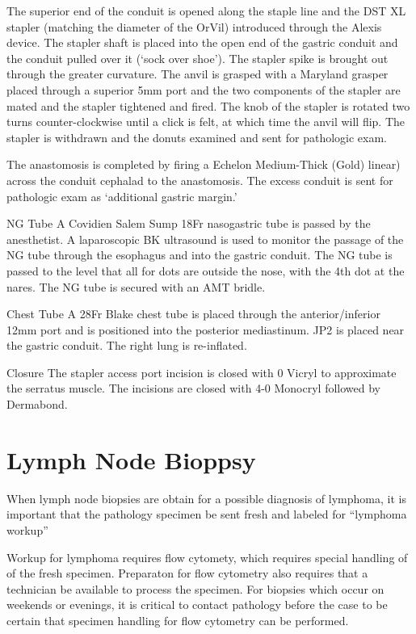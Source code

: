 \documentclass[
]{book}
\begin{document}
The superior end of the conduit is opened along the staple line and the DST XL stapler (matching the diameter of the OrVil) introduced through the Alexis device. The stapler shaft is placed into the open end of the gastric conduit and the conduit pulled over it (`sock over shoe'). The stapler spike is brought out through the greater curvature. The anvil is grasped with a Maryland grasper placed through a superior 5mm port and the two components of the stapler are mated and the stapler tightened and fired. The knob of the stapler is rotated two turns counter-clockwise until a click is felt, at which time the anvil will flip. The stapler is withdrawn and the donuts examined and sent for pathologic exam.

The anastomosis is completed by firing a Echelon Medium-Thick (Gold) linear) across the conduit cephalad to the anastomosis. The excess conduit is sent for pathologic exam as `additional gastric margin.'

NG Tube
A Covidien Salem Sump 18Fr nasogastric tube is passed by the anesthetist. A laparoscopic BK ultrasound is used to monitor the passage of the NG tube through the esophagus and into the gastric conduit. The NG tube is passed to the level that all for dots are outside the nose, with the 4th dot at the nares. The NG tube is secured with an AMT bridle.

Chest Tube
A 28Fr Blake chest tube is placed through the anterior/inferior 12mm port and is positioned into the posterior mediastinum. JP2 is placed near the gastric conduit. The right lung is re-inflated.

Closure
The stapler access port incision is closed with 0 Vicryl to approximate the serratus muscle. The incisions are closed with 4-0 Monocryl followed by Dermabond.

\hypertarget{node_salo}{%
\chapter{Lymph Node Bioppsy}\label{node_salo}}

When lymph node biopsies are obtain for a possible diagnosis of lymphoma, it is important that the pathology specimen be sent fresh and labeled for ``lymphoma workup''

Workup for lymphoma requires flow cytomety, which requires special handling of of the fresh specimen. Preparaton for flow cytometry also requires that a technician be available to process the specimen. For biopsies which occur on weekends or evenings, it is critical to contact pathology before the case to be certain that specimen handling for flow cytometry can be performed.
\end{document}
